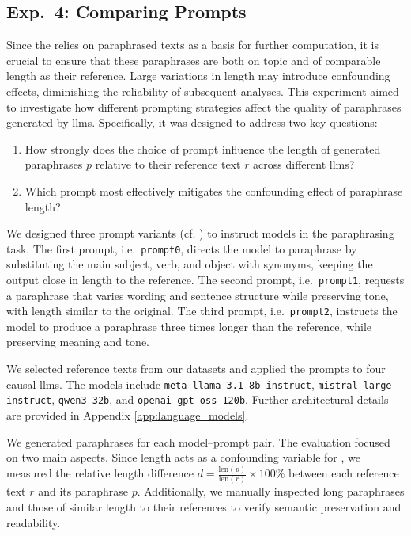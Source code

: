 \subsection{Exp.\ 4: Comparing Prompts}
\label{subsec:prompt_impact_setup}

Since the \impAppr{} relies on paraphrased texts as a basis for further computation, it is crucial to ensure that these paraphrases are both on topic and of comparable length as their reference.  
Large variations in length may introduce confounding effects, diminishing the reliability of subsequent analyses.
This experiment aimed to investigate how different prompting strategies affect the quality of paraphrases generated by \acp{llm}. 
Specifically, it was designed to address two key questions:
\begin{enumerate}
\item How strongly does the choice of prompt influence the length of generated paraphrases $p$ relative to their reference text $r$ across different \acp{llm}?
\item Which prompt most effectively mitigates the confounding effect of paraphrase length?
\end{enumerate}

We designed three prompt variants (cf. ) to instruct models in the paraphrasing task.
The first prompt, i.e.\ \texttt{prompt0}, directs the model to paraphrase by substituting the main subject, verb, and object with synonyms, keeping the output close in length to the reference.  
The second prompt, i.e.\ \texttt{prompt1}, requests a paraphrase that varies wording and sentence structure while preserving tone, with length similar to the original.  
The third prompt, i.e.\ \texttt{prompt2}, instructs the model to produce a paraphrase three times longer than the reference, while preserving meaning and tone. 

We selected reference texts from our datasets and applied the prompts to four causal \acp{llm}. 
The models include \texttt{meta-llama-3.1-8b-instruct}, \texttt{mistral-large-instruct}, \texttt{qwen3-32b}, and \texttt{openai-gpt-oss-120b}.
Further architectural details are provided in Appendix \ref{app:language_models}. 

We generated paraphrases for each model–prompt pair.
The evaluation focused on two main aspects. 
Since length acts as a confounding variable for \imps{}, we measured the relative length difference $d = \frac{\mathrm{len}(p)}{\mathrm{len}(r)}\times 100 \%$ between each reference text $r$ and its paraphrase $p$. 
Additionally, we manually inspected long paraphrases and those of similar length to their references to verify semantic preservation and readability.
